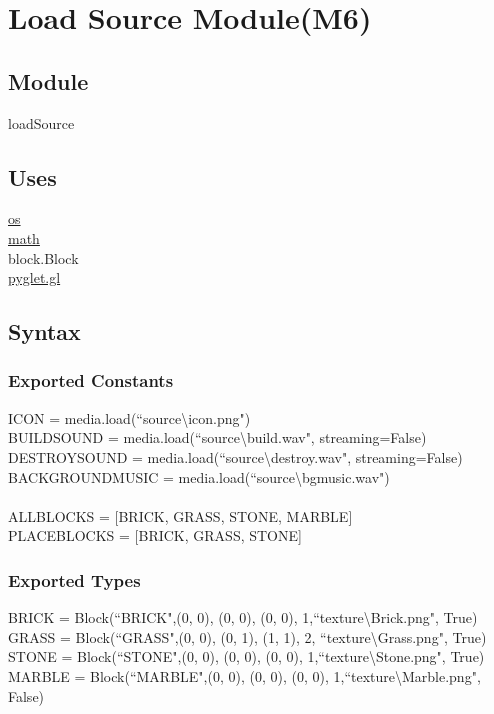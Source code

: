 \documentclass{article}
\begin{document}
\section {Load Source Module(M6)}

\subsection{Module}

loadSource

\subsection {Uses}

\href{https://docs.python.org/3/library/os.html}{os} \\
\href{https://docs.python.org/3/library/math.html}{math}\\
block.Block\\
\href{https://pyglet.readthedocs.io/en/latest/modules/gl.html}{pyglet.gl}

\subsection {Syntax}

\subsubsection {Exported Constants}
ICON = media.load(``source\textbackslash icon.png")\\
BUILDSOUND = media.load(``source\textbackslash build.wav", streaming=False)\\
DESTROYSOUND = media.load(``source\textbackslash destroy.wav", streaming=False)\\
BACKGROUNDMUSIC = media.load(``source\textbackslash bgmusic.wav")\\\\
ALLBLOCKS = [BRICK, GRASS, STONE, MARBLE]\\
PLACEBLOCKS = [BRICK, GRASS, STONE]

\subsubsection {Exported Types}
BRICK = Block(``BRICK",(0, 0), (0, 0), (0, 0), 1,``texture\textbackslash Brick.png", True)\\
GRASS = Block(``GRASS",(0, 0), (0, 1), (1, 1), 2, ``texture\textbackslash Grass.png", True)\\
STONE = Block(``STONE",(0, 0), (0, 0), (0, 0), 1,``texture\textbackslash Stone.png", True)\\
MARBLE = Block(``MARBLE",(0, 0), (0, 0), (0, 0), 1,``texture\textbackslash Marble.png", False)
\end{document}
